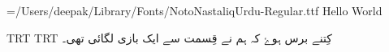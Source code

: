 \protected\edef{}
\protected\edef{}
\pagewidth=210mm
\pageheight=297mm
\hsize=210mm
\nopagenumbers
\parindent=0pt
\font\noto={/Users/deepak/Library/Fonts/NotoNastaliqUrdu-Regular.ttf}
Hello World

\textdir TRT
\pardir TRT
\noto
کِتنے برس ہوۓ کہ ہم نے قِسمت سے ایک بازی لگائی تھی۔
\bye
